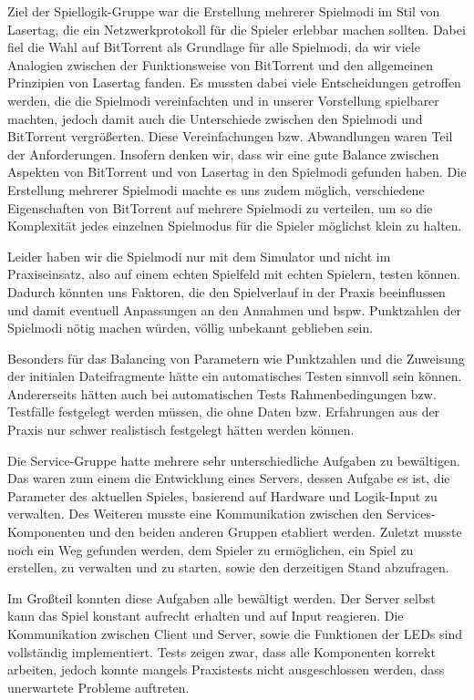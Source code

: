 Ziel der Spiellogik-Gruppe war die Erstellung mehrerer Spielmodi im Stil von 
Lasertag, die ein Netzwerkprotokoll für die Spieler erlebbar machen sollten. 
Dabei fiel die Wahl auf BitTorrent als Grundlage für alle Spielmodi, da wir viele 
Analogien zwischen der Funktionsweise von BitTorrent und den allgemeinen
Prinzipien von Lasertag fanden. Es mussten dabei viele Entscheidungen getroffen 
werden, die die Spielmodi vereinfachten und in unserer Vorstellung spielbarer
machten, jedoch damit auch die Unterschiede zwischen den Spielmodi und BitTorrent
vergrößerten. Diese Vereinfachungen bzw. Abwandlungen waren Teil der
Anforderungen. Insofern denken wir, dass wir eine gute Balance zwischen Aspekten 
von BitTorrent und von Lasertag in den Spielmodi gefunden haben. Die Erstellung
mehrerer Spielmodi machte es uns zudem möglich, verschiedene Eigenschaften von 
BitTorrent auf mehrere Spielmodi zu verteilen, um so die Komplexität jedes
einzelnen Spielmodus für die Spieler möglichst klein zu halten.

Leider haben wir die Spielmodi nur mit dem Simulator und nicht im Praxiseinsatz, 
also auf einem echten Spielfeld mit echten Spielern, testen können. Dadurch 
könnten uns Faktoren, die den Spielverlauf in der Praxis beeinflussen und damit
eventuell Anpassungen an den Annahmen und bspw. Punktzahlen der Spielmodi nötig 
machen würden, völlig unbekannt geblieben sein.

Besonders für das Balancing von Parametern wie Punktzahlen und die Zuweisung der
initialen Dateifragmente hätte ein automatisches Testen sinnvoll sein können.
Andererseits hätten auch bei automatischen Tests Rahmenbedingungen bzw. Testfälle 
festgelegt werden müssen, die ohne Daten bzw. Erfahrungen aus der Praxis nur schwer 
realistisch festgelegt hätten werden können.
\newline

Die Service-Gruppe hatte mehrere sehr unterschiedliche Aufgaben zu bewältigen. 
Das waren zum einem die Entwicklung eines Servers, dessen Aufgabe es ist, die Parameter des aktuellen Spieles, 
basierend auf Hardware und Logik-Input zu verwalten. Des Weiteren musste eine Kommunikation zwischen den 
Services-Komponenten und den beiden anderen Gruppen etabliert werden. Zuletzt musste noch ein Weg gefunden werden, 
dem Spieler zu ermöglichen, ein Spiel zu erstellen, zu verwalten und zu starten, sowie den derzeitigen Stand abzufragen.

Im Großteil konnten diese Aufgaben alle bewältigt werden. Der Server selbst kann das Spiel konstant aufrecht erhalten 
und auf Input reagieren. Die Kommunikation zwischen Client und Server, sowie die Funktionen der LEDs sind vollständig implementiert. 
Tests zeigen zwar, dass alle Komponenten korrekt arbeiten, jedoch konnte mangels Praxistests nicht ausgeschlossen werden, dass unerwartete Probleme auftreten.

